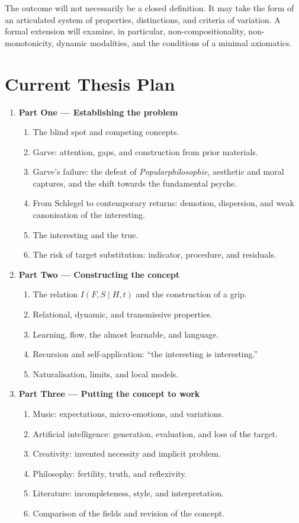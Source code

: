 \documentclass[11pt,a4paper]{article}
\begin{document}
The outcome will not necessarily be a closed definition. It may take the form
of an articulated system of properties, distinctions, and criteria of
variation. A formal extension will examine, in particular,
non-compositionality, non-monotonicity, dynamic modalities, and the conditions
of a minimal axiomatics.

\section{Current Thesis Plan}

\begin{enumerate}
  \item \textbf{Part One --- Establishing the problem}
    \begin{enumerate}
      \item The blind spot and competing concepts.
      \item Garve: attention, gaps, and construction from prior materials.
      \item Garve's failure: the defeat of \emph{Popularphilosophie}, aesthetic
            and moral captures, and the shift towards the fundamental psyche.
      \item From Schlegel to contemporary returns: demotion, dispersion, and
            weak canonisation of the interesting.
      \item The interesting and the true.
      \item The risk of target substitution: indicator, procedure, and residuals.
    \end{enumerate}
  \item \textbf{Part Two --- Constructing the concept}
    \begin{enumerate}
      \item The relation \(I(F,S\mid H,t)\) and the construction of a grip.
      \item Relational, dynamic, and transmissive properties.
      \item Learning, flow, the almost learnable, and language.
      \item Recursion and self-application: ``the interesting is interesting.''
      \item Naturalisation, limits, and local models.
    \end{enumerate}
  \item \textbf{Part Three --- Putting the concept to work}
    \begin{enumerate}
      \item Music: expectations, micro-emotions, and variations.
      \item Artificial intelligence: generation, evaluation, and loss of the
            target.
      \item Creativity: invented necessity and implicit problem.
      \item Philosophy: fertility, truth, and reflexivity.
      \item Literature: incompleteness, style, and interpretation.
      \item Comparison of the fields and revision of the concept.
    \end{enumerate}
\end{enumerate}
\end{document}
